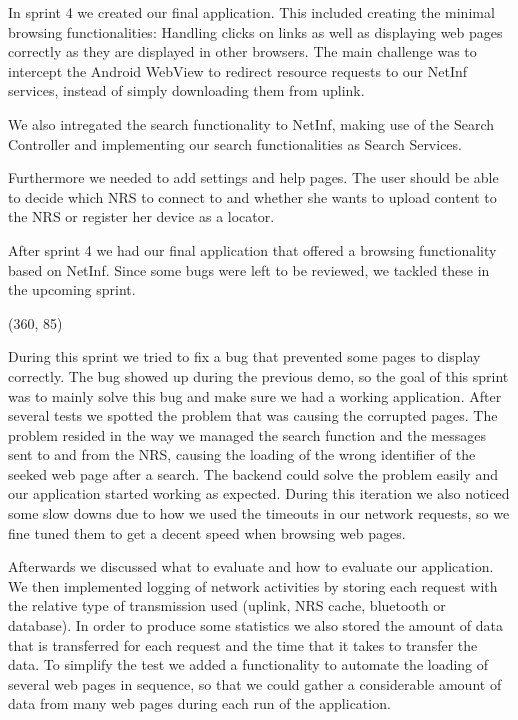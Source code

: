 In sprint 4 we created our final application. This included
creating the minimal browsing functionalities: Handling clicks on links
as well as displaying web pages correctly as they are displayed in
other browsers. The main challenge was to intercept the Android WebView
to redirect resource requests to our NetInf services, instead of simply
downloading them from uplink.

We also intregated the search functionality to NetInf, making use of the Search Controller and
implementing our search functionalities as Search Services.

Furthermore we needed to add settings and help pages. The user should
be able to decide which NRS to connect to and whether she wants to upload content to the NRS or
register her device as a locator.

After sprint 4 we had our final application that offered a browsing functionality
based on NetInf. Since some bugs were left to be reviewed, we tackled these
in the upcoming sprint.

\framebox(360, 85){
}

During this sprint we tried to fix a bug that prevented some pages to display correctly.
The bug showed up during the previous demo, so the goal of this sprint was to mainly
solve this bug and make sure we had a working application. After several tests we spotted the problem that was causing
the corrupted pages. The problem resided in the way we managed the search function and the messages sent to and from the NRS,
causing the loading of the wrong identifier of the seeked web page after a search. The backend could solve the problem easily and our application
started working as expected. During this iteration we also noticed some slow downs due to how we used the timeouts
in our network requests, so we fine tuned them to get a decent speed when browsing web pages.

Afterwards we discussed what to evaluate and how to evaluate our application. We then implemented logging of network
activities by storing each request with the relative type of transmission used (uplink, NRS cache, bluetooth or database).
In order to produce some statistics we also stored the amount of data that is transferred for each request and the time that
it takes to transfer the data. To simplify the test we added a functionality to automate the loading of several web pages
in sequence, so that we could gather a considerable amount of data from many web pages during each run of the application.

